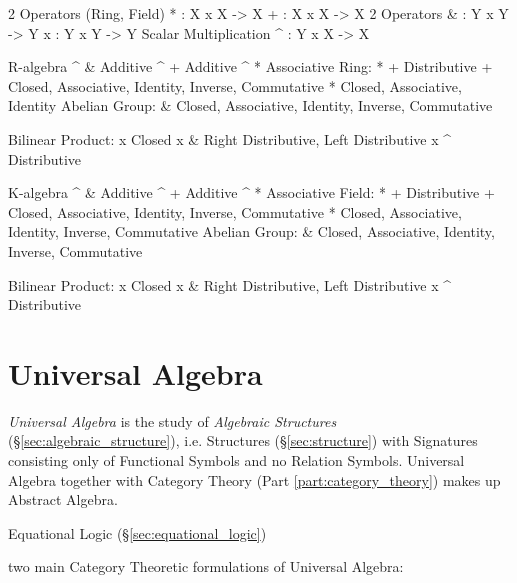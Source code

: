   2 Operators (Ring, Field)
  * : X x X -> X
  + : X x X -> X
  2 Operators
  & : Y x Y -> Y
  x : Y x Y -> Y
  Scalar Multiplication
  ^ : Y x X -> X

    R-algebra
                    ^ & Additive
                    ^ + Additive
                    ^ * Associative
              Ring: * + Distributive
                      + Closed, Associative, Identity, Inverse, Commutative
                      * Closed, Associative, Identity
            Abelian
             Group:   & Closed, Associative, Identity, Inverse, Commutative

            Bilinear
            Product:
                      x Closed
                    x & Right Distributive, Left Distributive
                    x ^ Distributive

    K-algebra
                    ^ & Additive
                    ^ + Additive
                    ^ * Associative
             Field: * + Distributive
                      + Closed, Associative, Identity, Inverse, Commutative
                      * Closed, Associative, Identity, Inverse, Commutative
            Abelian
             Group:   & Closed, Associative, Identity, Inverse, Commutative

            Bilinear
            Product:
                      x Closed
                    x & Right Distributive, Left Distributive
                    x ^ Distributive


\fi



\section{Universal Algebra}\label{sec:universal_algebra}

\emph{Universal Algebra} is the study of \emph{Algebraic Structures}
(\S\ref{sec:algebraic_structure}), i.e. Structures
(\S\ref{sec:structure}) with Signatures consisting only of Functional
Symbols and no Relation Symbols. Universal Algebra together with
Category Theory (Part \ref{part:category_theory}) makes up Abstract
Algebra.

Equational Logic (\S\ref{sec:equational_logic})

two main Category Theoretic formulations of Universal Algebra:

